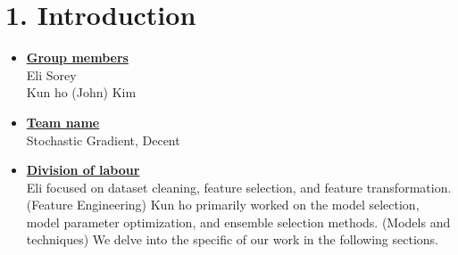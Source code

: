 \newif\ifshowsolutions
\showsolutionstrue

\newcommand{\boldline}[1]{\underline{\textbf{#1}}}

\usepackage[labelfont=bf]{caption}
\usepackage[labelfont=bf]{caption}
\usepackage[labelfont=bf]{caption}
\usepackage [english]{babel}
\usepackage [autostyle, english = american]{csquotes}

\setlength{\parindent}{0pt}



\pagestyle{fancy}

\section*{1. Introduction}
\medskip
\begin{itemize}

    \item \boldline{Group members} \\
    Eli Sorey \\
    Kun ho (John) Kim

    \item \boldline{Team name} \\
    Stochastic Gradient, Decent

    \item \boldline{Division of labour} \\
    Eli focused on dataset cleaning, feature selection, and feature transformation. (Feature Engineering) Kun ho primarily worked on the model
    selection, model parameter optimization, and ensemble selection methods. (Models and techniques) We delve into the specific of our work in the following sections.

\end{itemize}



